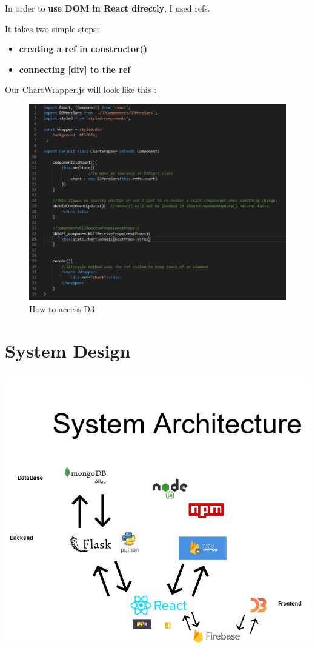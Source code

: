 In order to \textbf{use DOM in React directly}, I used refs.

It takes two simple steps:

\begin{itemize}

\item \textbf{creating a ref in constructor()}
\item \textbf{connecting [div] to the ref}

\end{itemize}\cite{d3}

Our ChartWrapper.js will look like this :


\begin{figure}[ht]
    \centering
    \includegraphics[scale=0.7]{img/D3Ref.PNG}
    \caption{How to access D3}
    \label{fig:my_label4}
\end{figure}

\chapter{System Design}
\begin{center}
      \includegraphics[scale=0.5]{img/basic architecture.png}
\end{center}

